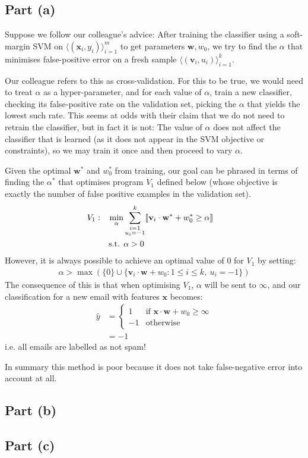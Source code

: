 \subsection{Part (a)}

Suppose we follow our colleague's advice: After training the classifier using a soft-margin SVM on $\langle(\mathbf{x}_i,y_i)\rangle_{i=1}^m$ to get parameters $\mathbf{w}, w_0$, we try to find the $\alpha$ that minimises false-positive error on a fresh sample $\langle(\mathbf{v}_i,u_i)\rangle_{i=1}^k$.

Our colleague refers to this as cross-validation. For this to be true, we would need to treat $\alpha$ as a hyper-parameter, and for each value of $\alpha$, train a new classifier, checking its false-positive rate on the validation set, picking the $\alpha$ that yields the lowest such rate. This seems at odds with their claim that we do not need to retrain the classifier, but in fact it is not: The value of $\alpha$ does not affect the classifier that is learned (as it does not appear in the SVM objective or constraints), so we may train it once and then proceed to vary $\alpha$.

Given the optimal $\mathbf{w}^\ast$ and $w_0^\ast$ from training, our goal can be phrased in terms of finding the $\alpha^\ast$ that optimises program $V_1$ defined below (whose objective is exactly the number of false positive examples in the validation set).
\begin{align*}
  V_1: && \min_{\alpha} & \sum_{\substack{i=1\\u_i=-1}}^k\llbracket \mathbf{v}_i\cdot\mathbf{w}^\ast+w_0^\ast\geq\alpha \rrbracket &&
  \\   && \text{s.t. } & \alpha > 0 &&
\end{align*}
However, it is always possible to achieve an optimal value of $0$ for $V_1$ by setting:
\begin{align*}
  \alpha > \max(\{0\}\cup\{\mathbf{v}_i\cdot\mathbf{w}+w_0:1\leq i\leq k,~u_i=-1\})
\end{align*}
The consequence of this is that when optimising $V_1$, $\alpha$ will be sent to $\infty$, and our classification for a new email with features $\mathbf{x}$ becomes:
\begin{align*}
  \widehat{y} & =
  \begin{cases}
    1 & \text{if }\mathbf{x}\cdot\mathbf{w} + w_0\geq\infty\\
    -1 & \text{otherwise}
  \end{cases}
  \\ & = -1
\end{align*}
i.e. all emails are labelled as not spam!

In summary this method is poor because it does not take false-negative error into account at all.

\subsection{Part (b)}

\subsection{Part (c)}

